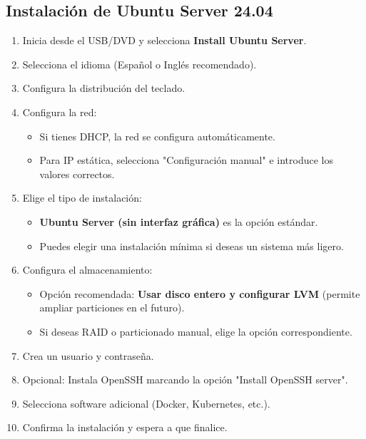 \documentclass{article}
\begin{document}
\subsection{Instalación de Ubuntu Server 24.04}\label{sec:instalacion}
\begin{enumerate}
    \item Inicia desde el USB/DVD y selecciona \textbf{Install Ubuntu Server}.
    \item Selecciona el idioma (Español o Inglés recomendado).
    \item Configura la distribución del teclado.
    \item Configura la red:
    \begin{itemize}
        \item Si tienes DHCP, la red se configura automáticamente.
        \item Para IP estática, selecciona "Configuración manual" e introduce los valores correctos.
    \end{itemize}
    \item Elige el tipo de instalación:
    \begin{itemize}
        \item \textbf{Ubuntu Server (sin interfaz gráfica)} es la opción estándar.
        \item Puedes elegir una instalación mínima si deseas un sistema más ligero.
    \end{itemize}
    \item Configura el almacenamiento:
    \begin{itemize}
        \item Opción recomendada: \textbf{Usar disco entero y configurar LVM} (permite ampliar particiones en el futuro).
        \item Si deseas RAID o particionado manual, elige la opción correspondiente.
    \end{itemize}
    \item Crea un usuario y contraseña.
    \item Opcional: Instala OpenSSH marcando la opción "Install OpenSSH server".
    \item Selecciona software adicional (Docker, Kubernetes, etc.).
    \item Confirma la instalación y espera a que finalice.
\end{enumerate}
\end{document}
